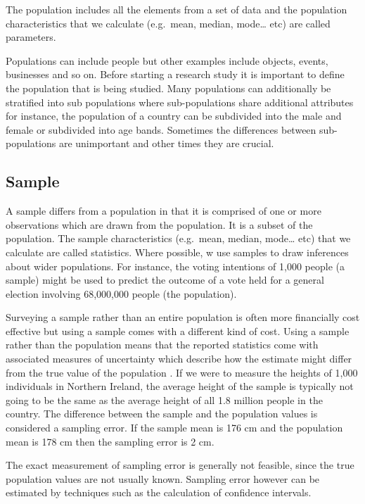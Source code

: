 \documentclass[
]{book}
\begin{document}
The population includes all the elements from a set of data and the population characteristics that we calculate (e.g.~mean, median, mode\ldots{} etc) are called parameters.

Populations can include people but other examples include objects, events, businesses and so on. Before starting a research study it is important to define the population that is being studied. Many populations can additionally be stratified into sub populations where sub-populations share additional attributes \citep{Frost2019} for instance, the population of a country can be subdivided into the male and female or subdivided into age bands. Sometimes the differences between sub-populations are unimportant and other times they are crucial.

\hypertarget{sample}{%
\subsection{Sample}\label{sample}}

A sample differs from a population in that it is comprised of one or more observations which are drawn from the population. It is a subset of the population. The sample characteristics (e.g.~mean, median, mode\ldots{} etc) that we calculate are called statistics. Where possible, w use samples to draw inferences about wider populations. For instance, the voting intentions of 1,000 people (a sample) might be used to predict the outcome of a vote held for a general election involving 68,000,000 people (the population).

Surveying a sample rather than an entire population is often more financially cost effective but using a sample comes with a different kind of cost. Using a sample rather than the population means that the reported statistics come with associated measures of uncertainty which describe how the estimate might differ from the true value of the population \citep{uncertainty}. If we were to measure the heights of 1,000 individuals in Northern Ireland, the average height of the sample is typically not going to be the same as the average height of all 1.8 million people in the country. The difference between the sample and the population values is considered a sampling error. If the sample mean is 176 cm and the population mean is 178 cm then the sampling error is 2 cm.

The exact measurement of sampling error is generally not feasible, since the true population values are not usually known. Sampling error however can be estimated by techniques such as the calculation of confidence intervals.
\end{document}
